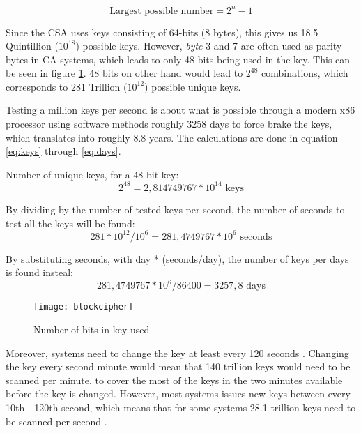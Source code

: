 \begin{equation} 
  \text{Largest possible number} = 2^{n} - 1
  \label{eq:num}
\end{equation}

Since the CSA uses keys consisting of 64-bits (8 bytes), this gives us 
18.5 Quintillion ($10^{18}$) possible keys. However, \emph{byte} 3 and 
7 are often used as parity bytes in CA systems, which leads to only 48 
bits being used in the key.  This can be seen in figure 
\ref{fig:blockcipher}. 48 bits on other hand would lead to $2^{48}$ 
combinations, which corresponds to 281 Trillion ($10^{12}$) possible 
unique keys. 

Testing a million keys per second is about what is possible through a 
modern x86 processor using software methods 
roughly 3258 days to force brake the keys, which translates into 
roughly 8.8 years. The calculations are done in equation \ref{eq:keys} 
through \ref{eq:days}. \citep{Breaking:2012}

Number of unique keys, for a 48-bit key:
\begin{equation}
  2^{48} = 2,814749767*10^{14} \text{ keys}
  \label{eq:keys}
\end{equation}

By dividing by the number of tested keys per second, the number of 
seconds to test all the keys will be found:
\begin{equation}
  281*10^{12} / 10^{6} = 281,4749767*10^{6} \text{ seconds}
  \label{eq:seconds}
\end{equation}

By substituting seconds, with day * (seconds/day), the number of keys 
per days is found insteal:
\begin{equation}
  281,4749767*10^{6} / 86400 = 3257,8 \text{ days}
  \label{eq:days}
\end{equation}

\begin{figure}[h!]
  \begin{center}
    \texttt{[image: blockcipher]}
  \end{center}
  \caption{Number of bits in key used}
  \label{fig:blockcipher}
\end{figure}

Moreover, systems need to change the key at least every 120 seconds 
\citep{Simpson:2009}. Changing the key every second minute would mean 
that 140 trillion keys would need to be scanned per minute, to cover 
the most of the keys in the two minutes available before the key is 
changed. However, most systems issues new keys between every 10th - 
120th second, which means that for some systems 28.1 trillion keys need 
to be scanned per second \citep{Wirt:2004}.

